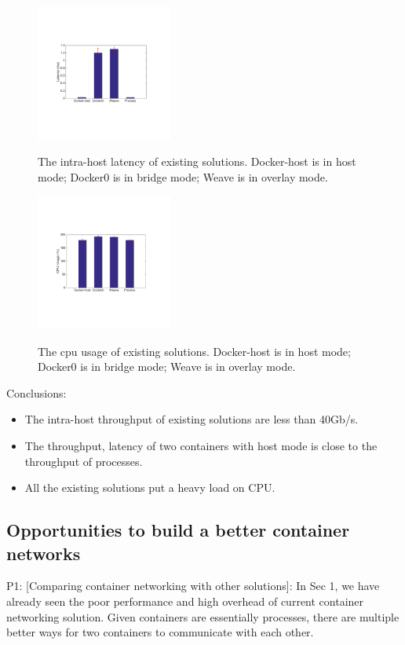 \begin{figure}[ht]
     \centering 
     \includegraphics[width=0.4\textwidth]{figures/motivation/eval_exist_latency.pdf} 
     \label{fig:eval_exist_latency}
     \caption{The intra-host latency of existing solutions. Docker-host is in host mode; Docker0 is in bridge mode; Weave is in overlay mode.} 
\end{figure} 

\begin{figure}[ht]
     \centering 
     \includegraphics[width=0.4\textwidth]{figures/motivation/eval_exist_cpu.pdf} 
     \label{fig:eval_exist_cpu}
     \caption{The cpu usage of existing solutions. Docker-host is in host mode; Docker0 is in bridge mode; Weave is in overlay mode.} 
\end{figure} 

Conclusions:
\begin{itemize}
  \item The intra-host throughput of existing solutions are less than 40Gb/s.
  \item The throughput, latency of two containers with host mode is close to the throughput of processes.
  \item All the existing solutions put a heavy load on CPU.
\end{itemize}

\subsection{Opportunities to build a better container networks}
P1: [Comparing container networking with other solutions]: In Sec 1, we have already seen the poor performance and high overhead of current container networking solution. Given containers are essentially processes, there are multiple better ways for two containers to communicate with each other.

